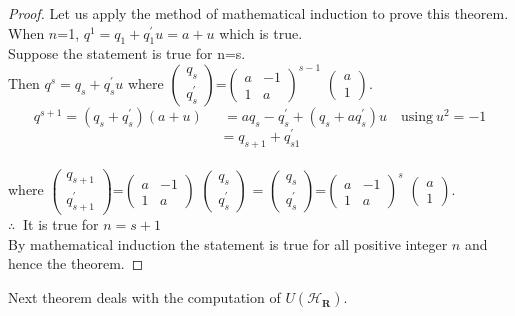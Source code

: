 \documentclass[sn-mathphys,Numbered]{sn-jnl}%
\theoremstyle{thmstyleone}
\theoremstyle{thmstyletwo}
\theoremstyle{thmstylethree}
\begin{document}
\begin{proof}
Let us apply the method of mathematical induction to prove this theorem. \\
When $n$=1, $q^{1}=q_{1}+q_{1}^{\prime}u=a+u$ which is true. \\
Suppose the statement is true for n=s. \\ Then $q^{s}=q_{s}+q_{s}^{\prime}u$ where $\left( \begin{array}{c} q_{s} \\
q_{s}^{\prime}\end{array}\right)$=$\left(\begin{array}{cc} a & -1 \\ 1 & a\end{array} \right)^{s-1}$ $\left( \begin{array}{c} a \\
1 \end{array}\right).$\\
$$q^{s+1}=(q_{s}+q_{s}^{\prime})(a+u) \quad \ \ =aq_{s}-q_{s}^{\prime}+(q_{s}+aq_{s}^{\prime})u  \quad \text{using}  \ u^{2}=-1$$
$$=q_{s+1}+q_{s1}^{\prime}$$ \\
where $\left( \begin{array}{c} q_{s+1} \\
q_{s+1}^{\prime}\end{array}\right)$=$\left(\begin{array}{cc} a & -1 \\ 1 & a\end{array} \right)$ $\left( \begin{array}{c} q_{s} \\
q_{s}^{\prime} \end{array}\right)$ = $\left( \begin{array}{c} q_{s} \\
q_{s}^{\prime}\end{array}\right)$=$\left(\begin{array}{cc} a & -1 \\ 1 & a\end{array} \right)^{s}$ $\left( \begin{array}{c} a \\
1 \end{array}\right).$\\
$\therefore \ $  It is true for $n=s+1$ \\
By mathematical induction the statement is true for all positive integer $n$ and hence the theorem. 
\end{proof}Next theorem deals with the computation of $U(\mathcal{H_{\mathbf{R}}})$.
\end{document}
